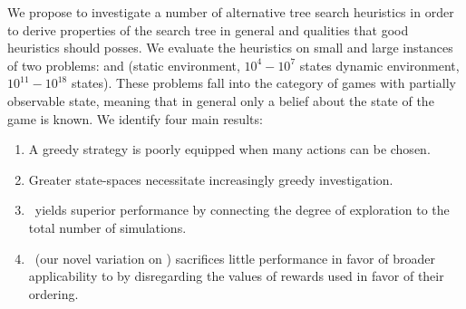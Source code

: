 We propose to investigate a number of alternative tree search heuristics in order to derive properties of the search tree in general and qualities that good heuristics should posses. We evaluate the heuristics on small and large instances of two problems: \rock and \poc (static environment, $10^4 - 10^7$ states \vs dynamic environment, $10^{11} - 10^{18}$ states). These problems fall into the category of games with partially observable state, meaning that in general only a belief about the state of the game is known. We identify four main results:
\vspace{-4mm}
\begin{enumerate}[topsep=0pt,itemsep=-1ex,partopsep=1ex,parsep=1ex]
\item A greedy strategy is poorly equipped when many actions can be chosen.
\item Greater state-spaces necessitate increasingly greedy investigation.
\item ~\soft yields superior performance by connecting the degree of exploration to the total number of simulations.
\item ~\rsoft (our novel variation on \soft) sacrifices little performance in favor of broader applicability to \soft by disregarding the values of rewards used in favor of their ordering.
\end{enumerate}